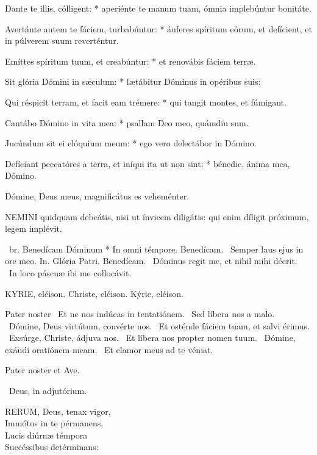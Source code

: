 Dante te illis, cólligent: * aperiénte te manum tuam, ómnia implebúntur bonitáte.

Avertánte autem te fáciem, turbabúntur: * áuferes spíritum eórum, et defícient, et in púlverem suum reverténtur.

Emíttes spíritum tuum, et creabúntur: * et renovábis fáciem terræ.

Sit glória Dómini in sæculum: * lætábitur Dóminus in opéribus suis:

Qui réspicit terram, et facit eam trémere: * qui tangit montes, et fúmigant.

Cantábo Dómino in vita mea: * psallam Deo meo, quámdiu sum.

Jucúndum sit ei elóquium meum: * ego vero delectábor in Dómino.

Defíciant peccatóres a terra, et iníqui ita ut non sint: * bénedic, ánima mea, Dómino.

 Dómine, Deus meus, magnificátus es veheménter.



\lettrine[lines=2]{N}{EMINI} quidquam debeátis, nisi ut ínvicem diligátis: qui enim díligit próximum, legem implévit.

\R\ br. Benedícam Dóminum * In omni témpore. Benedícam. \V\ Semper laus ejus in ore meo. In. Glória Patri. Benedícam. \V\ Dóminus regit me, et nihil mihi déerit. \R\ In loco páscuæ ibi me collocávit.



KYRIE, eléison. Christe, eléison. Kýrie, eléison.

Pater noster  \V\ Et ne nos indúcas in tentatiónem. \R\ Sed líbera nos a malo. \V\ Dómine, Deus virtútum, convérte nos. \R\ Et osténde fáciem tuam, et salvi érimus. \V\ Exsúrge, Christe, ádjuva nos. \R\ Et líbera nos propter nomen tuum. \V\ Dómine, exáudi oratiónem meam. \R\ Et clamor meus ad te véniat.



Pater noster et Ave.

\V\ Deus, in adjutórium.


\lettrine[lines=2]{R}{ERUM}, Deus, tenax vigor,\\
Immótus in te pérmanens,\\
Lucis diúrnæ témpora\\
Succéssibus detérminans:

